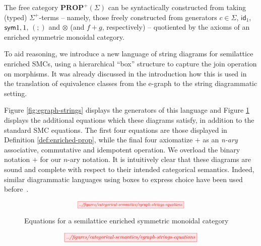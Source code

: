 The free category $\textbf{PROP}^+(\Sigma)$ can be syntactically constructed from taking (typed) $\Sigma^+$-terms  -- namely, those freely constructed from generators $c \in \Sigma$, $\textsf{id}_1$, $\textsf{sym}{1,1}$, $(;\!)$ and $\otimes$ (and $f+g$, respectively) -- quotiented by the axioms of an enriched symmetric monoidal category.  

To aid reasoning, we introduce a new language of string diagrams for semilattice enriched SMCs, using a hierarchical ``box'' structure to capture the join operation on morphisms.  It was already discussed in the introduction how this is  used in the translation of equivalence classes from the e-graph to the string diagrammatic setting. 

Figure \ref{fig:egraph-strings} displays the generators of this language and Figure \ref{fig:string-equations} displays the additional equations which these diagrams satisfy, in addition to the standard SMC equations. 
The first four equations are those displayed in Definition \ref{def:enriched-prop},  while the final four axiomatize $+$ as an \textit{n-ary} associative, commutative and idempotent operation.  We overload the binary notation $+$ for our $n$-ary notation.  
It is intuitively clear that these diagrams are sound and complete with respect to their intended categorical semantics. 
Indeed, similar diagrammatic languages using boxes to express choice have been used before~\cite{duncan_generalised_2009}. 

\ifdefined \ONECOLUMN
\begin{figure}
	\[  
		\scalebox{0.6}{
		\tikzfig{../figures/categorical-semantics/egraph-strings-equations}
		}
	\]
	\caption{Equations for a  semilattice enriched symmetric monoidal category}
	\label{fig:string-equations}
	\end{figure}
\else
\begin{figure*}
\[  
    \scalebox{0.75}{
	\tikzfig{../figures/categorical-semantics/egraph-strings-equations}
    }
\]
\caption{Equations for a  semilattice enriched symmetric monoidal category}
\label{fig:string-equations}
\end{figure*}
\fi